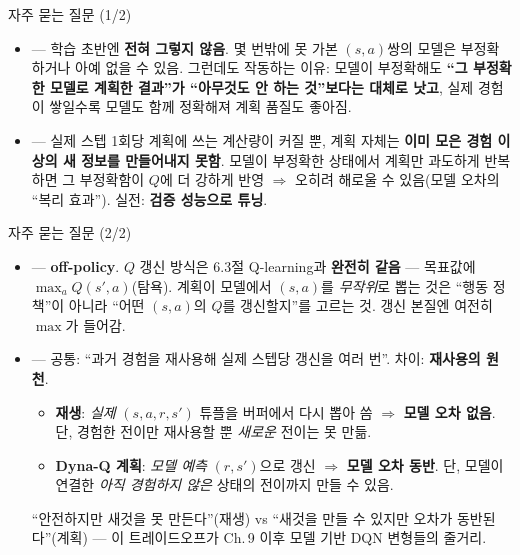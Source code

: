 \documentclass[aspectratio=169,11pt]{beamer}
\begin{document}
\begin{frame}{자주 묻는 질문 (1/2)}
  \begin{itemize}
    \item {}
      --- 학습 초반엔 \textbf{전혀 그렇지 않음}. 몇 번밖에 못
      가본 $(s,a)$쌍의 모델은 부정확하거나 아예 없을 수 있음.
      그런데도 작동하는 이유: 모델이 부정확해도
      \textbf{``그 부정확한 모델로 계획한 결과''가 ``아무것도
      안 하는 것''보다는 대체로 낫고}, 실제 경험이 쌓일수록
      모델도 함께 정확해져 계획 품질도 좋아짐.
    \item {}
      --- 실제 스텝 1회당 계획에 쓰는 계산량이 커질 뿐, 계획
      자체는 \textbf{이미 모은 경험 이상의 새 정보를 만들어내지
      못함}. 모델이 부정확한 상태에서 계획만 과도하게 반복하면
      그 부정확함이 $Q$에 더 강하게 반영 $\Rightarrow$ 오히려
      해로울 수 있음(모델 오차의 ``복리 효과''). 실전:
      \textbf{검증 성능으로 튜닝}.
  \end{itemize}
\end{frame}

\begin{frame}{자주 묻는 질문 (2/2)}
  \begin{itemize}
    \item {}
      --- \textbf{off-policy}. $Q$ 갱신 방식은 6.3절 Q-learning과
      \textbf{완전히 같음} --- 목표값에 $\max_a Q(s',a)$(탐욕).
      계획이 모델에서 $(s,a)$를 \textit{무작위}로 뽑는 것은
      ``행동 정책''이 아니라 ``어떤 $(s,a)$의 $Q$를 갱신할지''를
      고르는 것. 갱신 본질엔 여전히 $\max$가 들어감.
    \item {}
      --- 공통: ``과거 경험을 재사용해 실제 스텝당 갱신을 여러
      번''. 차이: \textbf{재사용의 원천}.
      \begin{itemize}
        \item \textbf{재생}: \textit{실제} $(s,a,r,s')$ 튜플을
          버퍼에서 다시 뽑아 씀 $\Rightarrow$ \textbf{모델 오차
          없음}. 단, 경험한 전이만 재사용할 뿐 \textit{새로운}
          전이는 못 만듦.
        \item \textbf{Dyna-Q 계획}: \textit{모델 예측} $(r,s')$으로
          갱신 $\Rightarrow$ \textbf{모델 오차 동반}. 단, 모델이
          연결한 \textit{아직 경험하지 않은} 상태의 전이까지
          만들 수 있음.
      \end{itemize}
      ``안전하지만 새것을 못 만든다''(재생) vs ``새것을 만들 수
      있지만 오차가 동반된다''(계획) --- 이 트레이드오프가
      Ch.\,9 이후 모델 기반 DQN 변형들의 줄거리.
  \end{itemize}
\end{frame}
\end{document}
